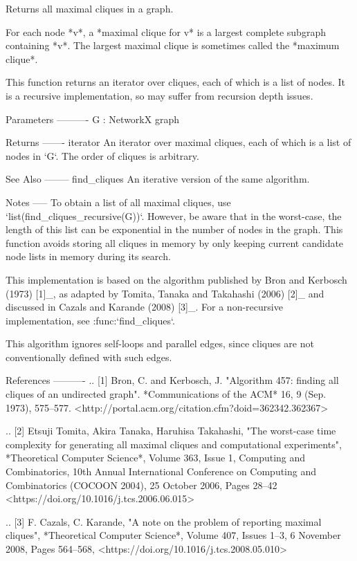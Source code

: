 \begin{DoxyVerb}Returns all maximal cliques in a graph.

For each node *v*, a *maximal clique for v* is a largest complete
subgraph containing *v*. The largest maximal clique is sometimes
called the *maximum clique*.

This function returns an iterator over cliques, each of which is a
list of nodes. It is a recursive implementation, so may suffer from
recursion depth issues.

Parameters
----------
G : NetworkX graph

Returns
-------
iterator
    An iterator over maximal cliques, each of which is a list of
    nodes in `G`. The order of cliques is arbitrary.

See Also
--------
find_cliques
    An iterative version of the same algorithm.

Notes
-----
To obtain a list of all maximal cliques, use
`list(find_cliques_recursive(G))`. However, be aware that in the
worst-case, the length of this list can be exponential in the number
of nodes in the graph. This function avoids storing all cliques in memory
by only keeping current candidate node lists in memory during its search.

This implementation is based on the algorithm published by Bron and
Kerbosch (1973) [1]_, as adapted by Tomita, Tanaka and Takahashi
(2006) [2]_ and discussed in Cazals and Karande (2008) [3]_. For a
non-recursive implementation, see :func:`find_cliques`.

This algorithm ignores self-loops and parallel edges, since cliques
are not conventionally defined with such edges.

References
----------
.. [1] Bron, C. and Kerbosch, J.
   "Algorithm 457: finding all cliques of an undirected graph".
   *Communications of the ACM* 16, 9 (Sep. 1973), 575--577.
   <http://portal.acm.org/citation.cfm?doid=362342.362367>

.. [2] Etsuji Tomita, Akira Tanaka, Haruhisa Takahashi,
   "The worst-case time complexity for generating all maximal
   cliques and computational experiments",
   *Theoretical Computer Science*, Volume 363, Issue 1,
   Computing and Combinatorics,
   10th Annual International Conference on
   Computing and Combinatorics (COCOON 2004), 25 October 2006, Pages 28--42
   <https://doi.org/10.1016/j.tcs.2006.06.015>

.. [3] F. Cazals, C. Karande,
   "A note on the problem of reporting maximal cliques",
   *Theoretical Computer Science*,
   Volume 407, Issues 1--3, 6 November 2008, Pages 564--568,
   <https://doi.org/10.1016/j.tcs.2008.05.010>\end{DoxyVerb}
 \mbox{\label{namespacenetworkx_1_1algorithms_1_1clique_a15ffd48517246617d89714f137b9c04a}} 
